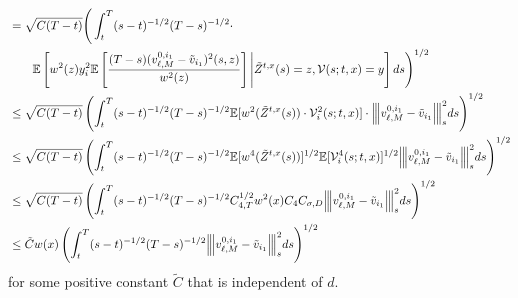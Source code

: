 \documentclass[11pt]{article}
\theoremstyle{definition}
\theoremstyle{plain}
\newcommand{\E}{\mathbb{E}}
\newcommand{\vertiii}[1]{{\left\vert\kern-0.25ex\left\vert\kern-0.25ex\left\vert #1 
    \right\vert\kern-0.25ex\right\vert\kern-0.25ex\right\vert}}
\begin{document}
\begin{appendices}
\begin{align*}
  &= \sqrt{C(T - t)}\Bigg( \int_t^T (s - t)^{-1/2} (T - s)^{-1/2} \cdot \\
  & \qquad \E\left[w^2(z) y_i^2\mathbb{E} \left[  \frac{(T-s) (v_{\ell,M}^{0, i_1} - \tilde{v}_{i_1})^2(s, z) }{w^2(z)} \right] \Bigg|\tilde{Z}^{t,x}(s) = z, \mathcal{V}(s; t,x) = y\right] ds \Bigg)^{1/2} \\
  &\leq \sqrt{C(T - t)}\left( \int_t^T (s - t)^{-1/2} (T - s)^{-1/2} \mathbb{E}[w^2(\tilde{Z}^{t,x}(s))\cdot \mathcal{V}_i^2(s; t,x)] 
  \cdot \vertiii{v_{\ell,M}^{0,i_1} - \tilde{v}_{i_1}}_{s}^2 ds \right)^{1/2} \\
  &\leq \sqrt{C(T - t)}\left( \int_t^T (s - t)^{-1/2} (T - s)^{-1/2} \mathbb{E}[w^4(\tilde{Z}^{t,x}(s))]^{1/2} \mathbb{E}[\mathcal{V}_i^4(s; t,x)]^{1/2}
   \vertiii{v_{\ell,M}^{0,i_1} - \tilde{v}_{i_1}}_s^2 ds \right)^{1/2} \\
   &\leq \sqrt{C(T - t)} \left( \int_t^T (s - t)^{-1/2} (T - s)^{-1/2} C_{4,T}^{1/2} w^2(x) C_4 C_{\sigma,D}
   \vertiii{v_{\ell,M}^{0,i_1} - \tilde{v}_{i_1}}_s^2 ds \right)^{1/2} \\
   &\leq \tilde C w(x) \left( \int_t^T (s - t)^{-1/2} (T - s)^{-1/2} 
   \vertiii{v_{\ell,M}^{0,i_1} - \tilde{v}_{i_1}}_s^2 ds \right)^{1/2}
  \end{align*}
  for some positive constant $\tilde C$ that is independent of $d$.
  

\end{appendices}
\end{document}
